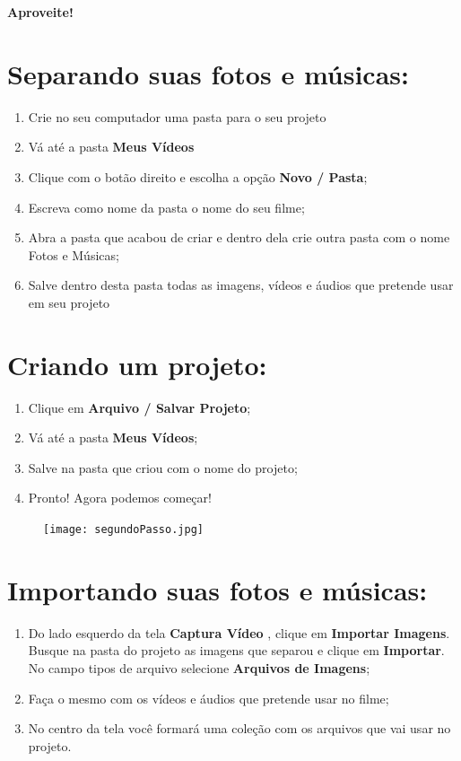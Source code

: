 \documentclass{article}
\begin{document}
{\textbf{Aproveite!}

\newpage

\section{Separando suas fotos e músicas:}
\begin{enumerate}
\item Crie no seu computador uma pasta para o seu projeto
\item Vá até a pasta \textbf{Meus Vídeos}
\item Clique com o botão direito e escolha a opção \textbf{Novo / Pasta};
\item Escreva como nome da pasta o nome do seu filme;
\item Abra a pasta que acabou de criar e dentro dela crie outra pasta com o nome Fotos e Músicas;
\item Salve dentro desta pasta todas as imagens, vídeos e áudios que pretende usar em seu projeto
\end{enumerate}

\section{Criando um projeto:}
\begin{enumerate}
\item Clique em \textbf{Arquivo / Salvar Projeto};
\item Vá até a pasta \textbf{Meus Vídeos};
\item Salve na pasta que criou com o nome do projeto;
\item Pronto! Agora podemos começar!
\end{enumerate}

\begin{figure}[h!]
\centering
\texttt{[image: segundoPasso.jpg]}
\end{figure}

\newpage

\section{Importando suas fotos e músicas:}
\begin{enumerate}
\item Do lado esquerdo da tela \textbf{Captura Vídeo} , clique em \textbf{Importar Imagens}. Busque na pasta do projeto as imagens que separou e clique em \textbf{Importar}. No campo tipos de arquivo selecione \textbf{Arquivos de Imagens};
\item Faça o mesmo com os vídeos e áudios que pretende usar no filme;
\item No centro da tela você formará uma coleção com os arquivos que vai usar no projeto.
\end{enumerate}

}
\end{document}
